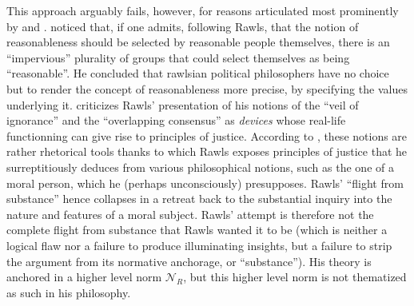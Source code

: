 \documentclass[preprint, french, english, 11pt, authoryear]{elsarticle}%
\begin{document}
This approach arguably fails, however, for reasons articulated most prominently by \cite{habermas_reconciliation_1995} and \cite{estlund_democratic_2009}. \citet{estlund_democratic_2009} noticed that, if one admits, following Rawls, that the notion of reasonableness should be selected by reasonable people themselves, there is an “impervious” plurality of groups that could select themselves as being “reasonable”. He concluded that rawlsian political philosophers have no choice but to render the concept of reasonableness more precise, by specifying the values underlying it. \cite{habermas_reconciliation_1995} criticizes Rawls' presentation of his notions of the “veil of ignorance” and the “overlapping consensus” as \emph{devices} whose real-life functionning can give rise to principles of justice. According to \cite{habermas_reconciliation_1995}, these notions are rather rhetorical tools thanks to which Rawls exposes principles of justice that he surreptitiously deduces from various philosophical notions, such as the one of a moral person, which he (perhaps unconsciously) presupposes. Rawls' ``flight from substance'' hence collapses in a retreat back to the substantial inquiry into the nature and features of a moral subject.  Rawls' attempt is therefore not the complete flight from substance that Rawls wanted it to be (which is neither a logical flaw nor a failure to produce illuminating insights, but a failure to strip the argument from its normative anchorage, or “substance”). His theory is anchored in a higher level norm $\mathscr{N}_R$, but this higher level norm is not thematized as such in his philosophy.
\end{document}
